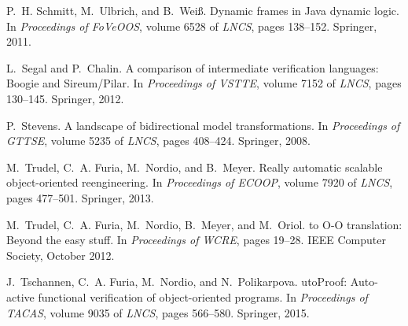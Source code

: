 \documentclass[a4paper,final]{llncs}
\newif\iflong
\begin{document}
\begin{thebibliography}{10}
P.~H. Schmitt, M.~Ulbrich, and B.~Wei{\ss}.
\newblock Dynamic frames in {J}ava dynamic logic.
\newblock In {\em Proceedings of FoVeOOS}, volume 6528 of {\em LNCS}, pages
  138--152. Springer, 2011.

L.~Segal and P.~Chalin.
\newblock A comparison of intermediate verification languages: {Boogie} and
  {Sireum/Pilar}.
\newblock In {\em Proceedings of VSTTE}, volume 7152 of {\em LNCS}, pages
  130--145. Springer, 2012.

P.~Stevens.
\newblock A landscape of bidirectional model transformations.
\newblock In {\em Proceedings of GTTSE}, volume 5235 of {\em LNCS}, pages
  408--424. Springer, 2008.

M.~Trudel, C.~A. Furia, M.~Nordio, and B.~Meyer.
\newblock Really automatic scalable object-oriented reengineering.
\newblock In {\em Proceedings of ECOOP}, volume 7920 of {\em LNCS}, pages
  477--501. Springer, 2013.

M.~Trudel, C.~A. Furia, M.~Nordio, B.~Meyer, and M.~Oriol.
 to {O-O} translation: Beyond the easy stuff.
\newblock In {\em Proceedings of WCRE}, pages 19--28. IEEE Computer Society,
  October 2012.

J.~Tschannen, C.~A. Furia, M.~Nordio, and N.~Polikarpova.
uto{P}roof: Auto-active functional verification of object-oriented
  programs.
\newblock In {\em Proceedings of TACAS}, volume 9035 of {\em LNCS}, pages
  566--580. Springer, 2015.

\end{thebibliography}
 


\iflong


\newpage
\clearpage
\appendix
\end{document}

